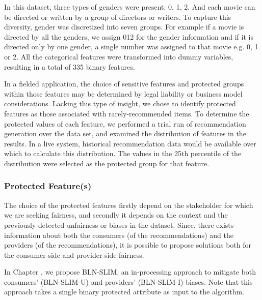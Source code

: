     
     In this dataset, three types of genders were present: 0, 1, 2. And each movie can be directed or written by a group of directors or writers. To capture this diversity, gender was discretized into seven groups. For example if a movie is directed by all the genders, we assign 012 for the gender information and if it is directed only by one gender, a single number was assigned to that movie e.g. 0, 1 or 2. All the categorical features were transformed into dummy variables, resulting in a total of 335 binary features.
    
    In a fielded application, the choice of sensitive features and protected groups within those features may be determined by legal liability or business model considerations. Lacking this type of insight, we chose to identify protected features as those associated with rarely-recommended items. To determine the protected values of each feature, we performed a trial run of recommendation generation over the data set, and examined the distribution of features in the results. In a live system, historical recommendation data would be available over which to calculate this distribution. The values in the 25th percentile of the distribution were selected as the protected group for that feature.

    
        \subsubsection{Protected Feature(s)}
        The choice of the protected features firstly depend on the stakeholder for which we are seeking fairness, and secondly it depends on the context and the previously detected unfairness or biases in the dataset. Since, there exists information about both the consumers (of the recommendations) and the providers (of the recommendations), it is possible to propose solutions both for the consumer-side and provider-side fairness.
        
        In Chapter , we propose BLN-SLIM, an in-processing approach to mitigate both consumers' (BLN-SLIM-U) and providers' (BLN-SLIM-I) biases. Note that this approach takes a single binary protected attribute as input to the algorithm.
        
